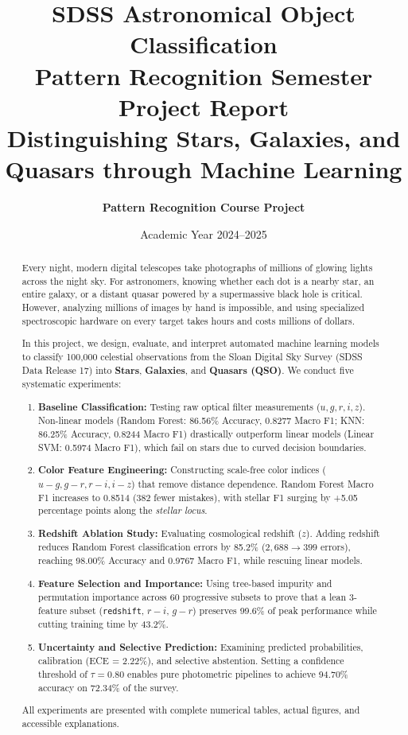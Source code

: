 \documentclass[11pt,a4paper]{article}
\title{\vspace{-1.5em}\textbf{SDSS Astronomical Object Classification}\\
\Large Pattern Recognition Semester Project Report\\
\large Distinguishing Stars, Galaxies, and Quasars through Machine Learning}
\author{\textbf{Pattern Recognition Course Project}}
\date{Academic Year 2024--2025}
\begin{document}
\maketitle

\begin{abstract}
Every night, modern digital telescopes take photographs of millions of glowing lights across the night sky. For astronomers, knowing whether each dot is a nearby star, an entire galaxy, or a distant quasar powered by a supermassive black hole is critical. However, analyzing millions of images by hand is impossible, and using specialized spectroscopic hardware on every target takes hours and costs millions of dollars. 

In this project, we design, evaluate, and interpret automated machine learning models to classify 100,000 celestial observations from the Sloan Digital Sky Survey (SDSS Data Release 17) into \textbf{Stars}, \textbf{Galaxies}, and \textbf{Quasars (QSO)}. We conduct five systematic experiments:
\begin{enumerate}[noitemsep,topsep=0pt]
    \item \textbf{Baseline Classification:} Testing raw optical filter measurements ($u, g, r, i, z$). Non-linear models (Random Forest: 86.56\% Accuracy, 0.8277 Macro F1; KNN: 86.25\% Accuracy, 0.8244 Macro F1) drastically outperform linear models (Linear SVM: 0.5974 Macro F1), which fail on stars due to curved decision boundaries.
    \item \textbf{Color Feature Engineering:} Constructing scale-free color indices ($u-g, g-r, r-i, i-z$) that remove distance dependence. Random Forest Macro F1 increases to 0.8514 (382 fewer mistakes), with stellar F1 surging by +5.05 percentage points along the \emph{stellar locus}.
    \item \textbf{Redshift Ablation Study:} Evaluating cosmological redshift ($z$). Adding redshift reduces Random Forest classification errors by 85.2\% ($2,688 \to 399$ errors), reaching 98.00\% Accuracy and 0.9767 Macro F1, while rescuing linear models.
    \item \textbf{Feature Selection and Importance:} Using tree-based impurity and permutation importance across 60 progressive subsets to prove that a lean 3-feature subset (\texttt{redshift}, $r-i$, $g-r$) preserves 99.6\% of peak performance while cutting training time by 43.2\%.
    \item \textbf{Uncertainty and Selective Prediction:} Examining predicted probabilities, calibration (ECE = 2.22\%), and selective abstention. Setting a confidence threshold of $\tau = 0.80$ enables pure photometric pipelines to achieve 94.70\% accuracy on 72.34\% of the survey.
\end{enumerate}
All experiments are presented with complete numerical tables, actual figures, and accessible explanations.
\end{abstract}
\end{document}
